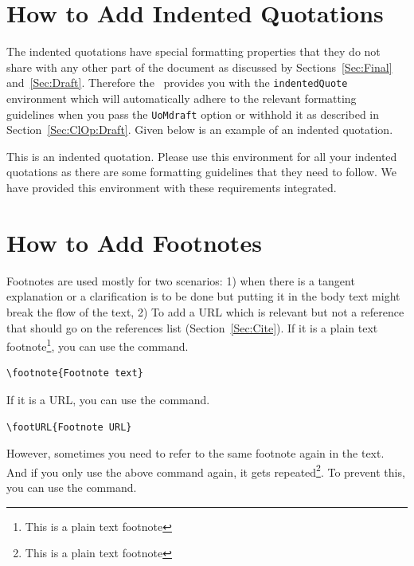 \documentclass[12pt]{uomthesis}
\begin{document}
\section{How to Add Indented Quotations}
The indented quotations have special formatting properties that they do not share with any other part of the document as discussed by Sections~\ref{Sec:Final} and~\ref{Sec:Draft}. Therefore the~\TheClass{} provides you with the \texttt{indentedQuote} environment which will automatically adhere to the relevant formatting guidelines when you pass the \texttt{UoMdraft} option or withhold it as described in Section~\ref{Sec:ClOp:Draft}. Given below is an example of an indented quotation.

\begin{indentedQuote}
This is an indented quotation. Please use this environment for all your indented quotations as there are some formatting guidelines that they need to follow. We have provided this environment with these requirements integrated. 
\end{indentedQuote}

\section{How to Add Footnotes}
Footnotes are used mostly for two scenarios: 1) when there is a tangent explanation or a clarification is to be done but putting it in the body text might break the flow of the text, 2) To add a URL which is relevant but not a reference that should go on the references list (Section~\ref{Sec:Cite}). If it is a plain text footnote\footnote{This is a plain text footnote}, you can use the  command.

\begin{indentedQuote}
\begin{verbatim}
\footnote{Footnote text}
\end{verbatim}
\end{indentedQuote}

If it is a URL, you can use the  command.

\begin{indentedQuote}
\begin{verbatim}
\footURL{Footnote URL}
\end{verbatim}
\end{indentedQuote}

However, sometimes you need to refer to the same footnote again in the text. And if you only use the above command again, it gets repeated\footnote{This is a plain text footnote}. To prevent this, you can use the  command. 
\end{document}
